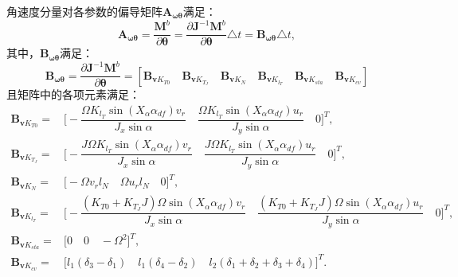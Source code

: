 角速度分量对各参数的偏导矩阵$\boldsymbol{A}_{\boldsymbol{\omega \theta}}$满足：
\begin{equation}
    \boldsymbol{A}_{\boldsymbol{\omega \theta}} = \frac{\boldsymbol{M}^b}{\partial \boldsymbol{\theta}} = \frac{\partial \boldsymbol{J}^{-1} \boldsymbol{M}^b}{\partial \boldsymbol{\theta}} \triangle t = \boldsymbol{B}_{\boldsymbol{\omega \theta}} \triangle t,
\end{equation}
其中，$\boldsymbol{B}_{\boldsymbol{\omega \theta}}$满足：
\begin{equation}
    \boldsymbol{B}_{\boldsymbol{\omega \theta}} = \frac{\partial \boldsymbol{J}^{-1} \boldsymbol{M}^b}{\partial \boldsymbol{\theta}} = [
        \boldsymbol{B}_{\boldsymbol{v}K_{T0}} \quad
        \boldsymbol{B}_{\boldsymbol{v}K_{T_J}} \quad
        \boldsymbol{B}_{\boldsymbol{v}K_{N}} \quad
        \boldsymbol{B}_{\boldsymbol{v}K_{l_T}} \quad
        \boldsymbol{B}_{\boldsymbol{v}K_{sta}} \quad
        \boldsymbol{B}_{\boldsymbol{v}K_{cv}}
    ]
\end{equation}
且矩阵中的各项元素满足：
\begin{equation}
    \begin{aligned}
        \boldsymbol{B}_{\boldsymbol{v}K_{T0}} =& 
        \biggl[
            -\dfrac{\Omega K_{l_T} \sin(X_\alpha \alpha_{df}) v_r}{J_x \sin\alpha} \quad
            \dfrac{\Omega K_{l_T} \sin(X_\alpha \alpha_{df}) u_r}{J_y \sin\alpha} \quad
            0
        \biggr]^T, \\
        \boldsymbol{B}_{\boldsymbol{v}K_{T_J}} =& 
        \biggl[
            -\dfrac{J \Omega K_{l_T} \sin(X_\alpha \alpha_{df}) v_r}{J_x \sin\alpha} \quad
            \dfrac{J \Omega K_{l_T} \sin(X_\alpha \alpha_{df}) u_r}{J_y \sin\alpha} \quad
            0
        \biggr]^T, \\
        \boldsymbol{B}_{\boldsymbol{v}K_{N}} =& 
        \biggl[
            -\Omega v_r l_N \quad
            \Omega u_r l_N \quad
            0
        \biggr]^T, \\
        \boldsymbol{B}_{\boldsymbol{v}K_{l_T}} =& 
        \biggl[
            -\dfrac{(K_{T0} + K_{T_J}J) \Omega \sin(X_\alpha \alpha_{df}) v_r}{J_x \sin\alpha} \quad
            \dfrac{(K_{T0} + K_{T_J}J) \Omega \sin(X_\alpha \alpha_{df}) u_r}{J_y \sin\alpha} \quad
            0
        \biggr]^T, \\
        \boldsymbol{B}_{\boldsymbol{v}K_{sta}} =& \biggl[0 \quad 0 \quad -\Omega^2\biggr]^T, \\
        \boldsymbol{B}_{\boldsymbol{v}K_{cv}} =& \biggl[l_1 (\delta_3 - \delta_1) \quad l_1 (\delta_4 - \delta_2) \quad l_2 (\delta_1 + \delta_2 + \delta_3 + \delta_4)\biggr]^T. \\
    \end{aligned}
\end{equation}
